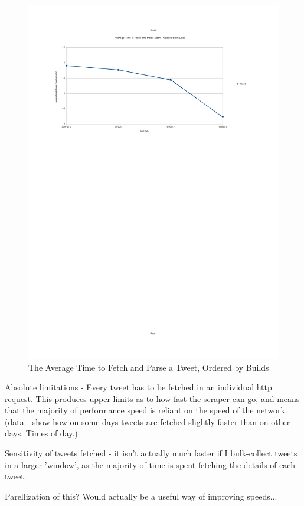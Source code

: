 \begin{figure}[h!]
\centering
\includegraphics{Images/average_time_to_fetch_parse_tweets_per_build.pdf}
\caption{The Average Time to Fetch and Parse a Tweet, Ordered by Builds}
\end{figure}

Absolute limitations - Every tweet has to be fetched in an individual http request. This produces upper limits as to how fast the scraper can go, and means that the majority of performance speed is reliant on the speed of the network. (data - show how on some days tweets are fetched slightly faster than on other days. Times of day.)

Sensitivity of tweets fetched - it isn't actually much faster if I bulk-collect tweets in a larger 'window', as the majority of time is spent fetching the details of each tweet. 

Parellization of this? Would actually be a useful way of improving speeds...

